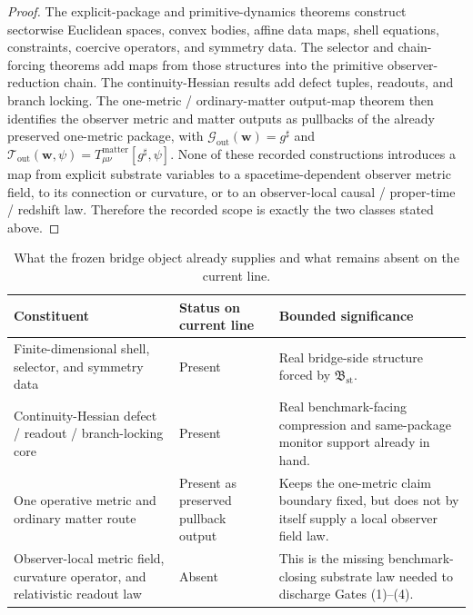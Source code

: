 \documentclass[11pt]{article}
\newcommand{\StableBridgeObject}{\mathfrak B_{\mathrm{st}}}
\newcommand{\FixedMetric}{g^{\sharp}}
\newcommand{\MetricOut}{\mathscr G_{\mathrm{out}}}
\newcommand{\MatterOut}{\mathscr T_{\mathrm{out}}}
\begin{document}
\begin{proof}
The explicit-package and primitive-dynamics theorems construct sectorwise Euclidean spaces, convex bodies, affine data maps, shell equations, constraints, coercive operators, and symmetry data. The selector and chain-forcing theorems add maps from those structures into the primitive observer-reduction chain. The continuity-Hessian results add defect tuples, readouts, and branch locking. The one-metric / ordinary-matter output-map theorem then identifies the observer metric and matter outputs as pullbacks of the already preserved one-metric package, with \(\MetricOut(\mathbf w)=\FixedMetric\) and \(\MatterOut(\mathbf w,\psi)=T_{\mu\nu}^{\mathrm{matter}}[\FixedMetric,\psi]\). None of these recorded constructions introduces a map from explicit substrate variables to a spacetime-dependent observer metric field, to its connection or curvature, or to an observer-local causal / proper-time / redshift law. Therefore the recorded scope is exactly the two classes stated above.
\end{proof}

\begin{table}[ht]
\centering
\renewcommand{\arraystretch}{1.2}
\begin{tabular}{>{\raggedright\arraybackslash}p{} >{\raggedright\arraybackslash}p{} >{\raggedright\arraybackslash}p{}}
\toprule
\textbf{Constituent} & \textbf{Status on current line} & \textbf{Bounded significance} \\
\midrule
Finite-dimensional shell, selector, and symmetry data & Present & Real bridge-side structure forced by \(\StableBridgeObject\). \\
Continuity-Hessian defect / readout / branch-locking core & Present & Real benchmark-facing compression and same-package monitor support already in hand. \\
One operative metric and ordinary matter route & Present as preserved pullback output & Keeps the one-metric claim boundary fixed, but does not by itself supply a local observer field law. \\
Observer-local metric field, curvature operator, and relativistic readout law & Absent & This is the missing benchmark-closing substrate law needed to discharge Gates (1)--(4). \\
\bottomrule
\end{tabular}
\caption{What the frozen bridge object already supplies and what remains absent on the current line.}
\label{tab:scope}
\end{table}
\end{document}
